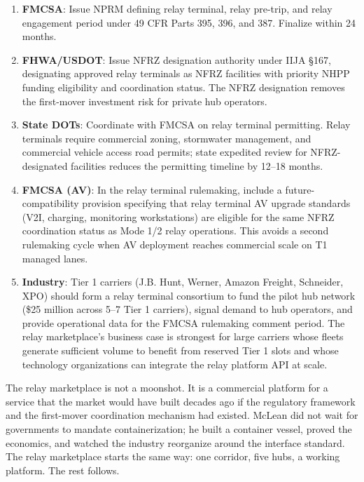 \begin{enumerate}
  \item \textbf{FMCSA}: Issue NPRM defining relay terminal, relay pre-trip, and relay
  engagement period under 49 CFR Parts 395, 396, and 387. Finalize within 24 months.

  \item \textbf{FHWA/USDOT}: Issue NFRZ designation authority under IIJA \S 167, designating
  approved relay terminals as NFRZ facilities with priority NHPP funding eligibility and
  coordination status. The NFRZ designation removes the first-mover investment risk for
  private hub operators.

  \item \textbf{State DOTs}: Coordinate with FMCSA on relay terminal permitting. Relay
  terminals require commercial zoning, stormwater management, and commercial vehicle access
  road permits; state expedited review for NFRZ-designated facilities reduces the permitting
  timeline by 12--18 months.

  \item \textbf{FMCSA (AV)}: In the relay terminal rulemaking, include a future-compatibility
  provision specifying that relay terminal AV upgrade standards (V2I, charging, monitoring
  workstations) are eligible for the same NFRZ coordination status as Mode 1/2 relay
  operations. This avoids a second rulemaking cycle when AV deployment reaches commercial
  scale on T1 managed lanes.

  \item \textbf{Industry}: Tier 1 carriers (J.B. Hunt, Werner, Amazon Freight, Schneider,
  XPO) should form a relay terminal consortium to fund the pilot hub network (\$25 million
  across 5--7 Tier 1 carriers), signal demand to hub operators, and provide operational
  data for the FMCSA rulemaking comment period. The relay marketplace's business case is
  strongest for large carriers whose fleets generate sufficient volume to benefit from
  reserved Tier 1 slots and whose technology organizations can integrate the relay platform
  API at scale.
\end{enumerate}

The relay marketplace is not a moonshot. It is a commercial platform for a service that the
market would have built decades ago if the regulatory framework and the first-mover coordination
mechanism had existed. McLean did not wait for governments to mandate containerization; he
built a container vessel, proved the economics, and watched the industry reorganize around
the interface standard. The relay marketplace starts the same way: one corridor, five hubs,
a working platform. The rest follows.
